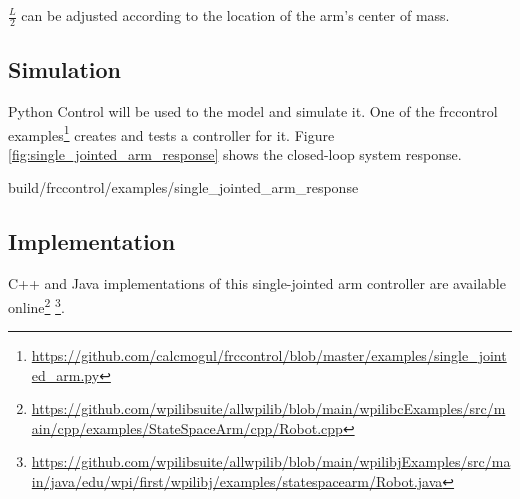 $\frac{L}{2}$ can be adjusted according to the location of the arm's center of
mass.

\subsection{Simulation}

Python Control will be used to  the
\gls{model} and simulate it. One of the frccontrol
examples\footnote{\url{https://github.com/calcmogul/frccontrol/blob/master/examples/single_jointed_arm.py}}
creates and tests a controller for it. Figure
\ref{fig:single_jointed_arm_response} shows the closed-loop \gls{system}
response.
\begin{svg}{build/frccontrol/examples/single_jointed_arm_response}
  \caption{Single-jointed arm response}
  \label{fig:single_jointed_arm_response}
\end{svg}

\subsection{Implementation}

C++ and Java implementations of this single-jointed arm controller are available
online\footnote{\url{https://github.com/wpilibsuite/allwpilib/blob/main/wpilibcExamples/src/main/cpp/examples/StateSpaceArm/cpp/Robot.cpp}}
\footnote{\url{https://github.com/wpilibsuite/allwpilib/blob/main/wpilibjExamples/src/main/java/edu/wpi/first/wpilibj/examples/statespacearm/Robot.java}}.
